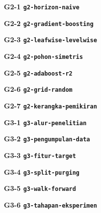 \documentclass[jenis=praskripsi]{upnjatim-skripsi}
\begin{document}
\pagestyle{empty}

\newcommand{\pratinjau}[2]{%
  \begin{center}
    \textbf{#1}\par\medskip
    
  \end{center}
  \clearpage}

\pratinjau{G2-1 \quad \texttt{g2-horizon-naive}}{g2-horizon-naive}
\pratinjau{G2-2 \quad \texttt{g2-gradient-boosting}}{g2-gradient-boosting}
\pratinjau{G2-3 \quad \texttt{g2-leafwise-levelwise}}{g2-leafwise-levelwise}
\pratinjau{G2-4 \quad \texttt{g2-pohon-simetris}}{g2-pohon-simetris}
\pratinjau{G2-5 \quad \texttt{g2-adaboost-r2}}{g2-adaboost-r2}
\pratinjau{G2-6 \quad \texttt{g2-grid-random}}{g2-grid-random}
\pratinjau{G2-7 \quad \texttt{g2-kerangka-pemikiran}}{g2-kerangka-pemikiran}
\pratinjau{G3-1 \quad \texttt{g3-alur-penelitian}}{g3-alur-penelitian}
\pratinjau{G3-2 \quad \texttt{g3-pengumpulan-data}}{g3-pengumpulan-data}
\pratinjau{G3-3 \quad \texttt{g3-fitur-target}}{g3-fitur-target}
\pratinjau{G3-4 \quad \texttt{g3-split-purging}}{g3-split-purging}
\pratinjau{G3-5 \quad \texttt{g3-walk-forward}}{g3-walk-forward}
\pratinjau{G3-6 \quad \texttt{g3-tahapan-eksperimen}}{g3-tahapan-eksperimen}
\end{document}
